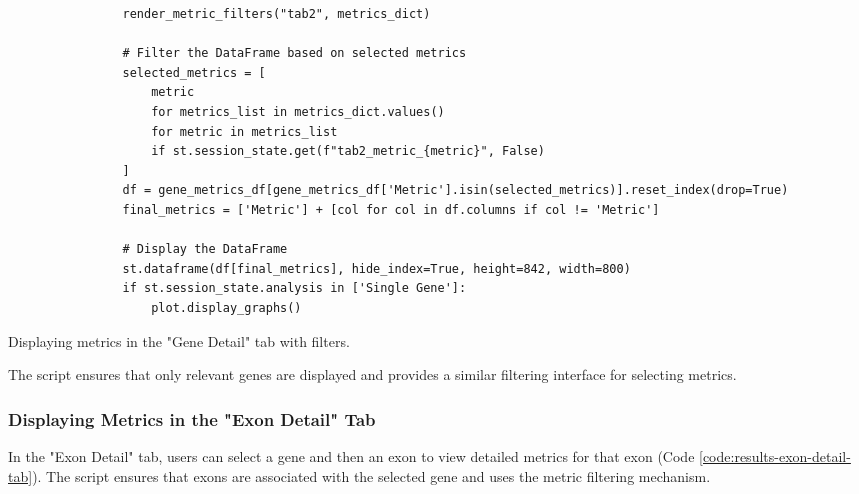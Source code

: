 \begin{longlisting}
\begin{verbatim}
                render_metric_filters("tab2", metrics_dict)

                # Filter the DataFrame based on selected metrics
                selected_metrics = [
                    metric
                    for metrics_list in metrics_dict.values()
                    for metric in metrics_list
                    if st.session_state.get(f"tab2_metric_{metric}", False)
                ]
                df = gene_metrics_df[gene_metrics_df['Metric'].isin(selected_metrics)].reset_index(drop=True)
                final_metrics = ['Metric'] + [col for col in df.columns if col != 'Metric']

                # Display the DataFrame
                st.dataframe(df[final_metrics], hide_index=True, height=842, width=800)
                if st.session_state.analysis in ['Single Gene']:
                    plot.display_graphs()
\end{verbatim}
\caption{Displaying metrics in the "Gene Detail" tab with filters.}
\label{code:results-gene-detail-tab}
\end{longlisting}

The script ensures that only relevant genes are displayed and provides a similar filtering interface for selecting metrics.

\subsubsection{\textbf{Displaying Metrics in the "Exon Detail" Tab}}

In the "Exon Detail" tab, users can select a gene and then an exon to view detailed metrics for that exon (Code \ref{code:results-exon-detail-tab}). The script ensures that exons are associated with the selected gene and uses the metric filtering mechanism.

